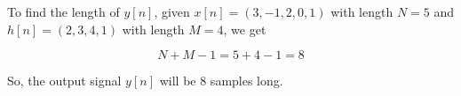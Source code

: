 
\item[(a)]
To find the length of $y[n]$, given
$x[n] = (3, -1, 2, 0, 1)$ with length $N = 5$ and
$h[n] = (2, 3, 4, 1)$ with length $M = 4$, we get

$$
N + M - 1 = 5 + 4 - 1 = 8
$$

So, the output signal $y[n]$ will be 8 samples long.

